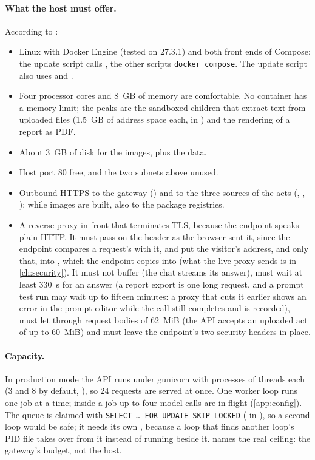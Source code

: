 \paragraph{What the host must offer.} According to :
\begin{itemize}
  \item Linux with Docker Engine (tested on 27.3.1) and both front ends of Compose: the update
    script calls , the other scripts \texttt{docker compose}. The update
    script also uses  and .
  \item Four processor cores and 8~GB of memory are comfortable. No container has a memory
    limit; the peaks are the sandboxed children that extract text from uploaded files (1.5~GB
    of address space each,  in ) and the
    rendering of a report as PDF.
  \item About 3~GB of disk for the images, plus the data.
  \item Host port 80 free, and the two subnets above unused.
  \item Outbound HTTPS to the gateway () and to the three sources of the
    acts (, , ); while images
    are built, also to the package registries.
  \item A reverse proxy in front that terminates TLS, because the endpoint speaks plain HTTP.
    It must pass on the  header as the browser sent it, since the endpoint compares
    a request's  with it, and put the visitor's address, and only that, into
    , which the endpoint copies into  (what the live
    proxy sends is in \cref{ch:security}). It must not buffer  (the
    chat streams its answer), must wait at
    least 330~s for an answer (a report export is one long request, and a prompt test run may
    wait up to fifteen minutes: a proxy that cuts it earlier shows an error in the prompt
    editor while the call still completes and is recorded),
    must let through request bodies of 62~MiB (the API accepts an uploaded act of up to
    60~MiB) and must leave the endpoint's two security headers in place.
\end{itemize}

\paragraph{Capacity.} In production mode the API runs under gunicorn with
 processes of  threads each (3 and 8 by
default, ), so 24 requests are served at once. One worker loop
runs one job at a time; inside a job up to four model calls are in flight
(\cref{app:config}). The queue is claimed with \texttt{SELECT … FOR UPDATE SKIP LOCKED}
( in ), so a second loop would be safe; it needs its own
, because a loop that finds another loop's PID file takes over from it
instead of running beside it.  names the real ceiling: the gateway's
budget, not the host.


